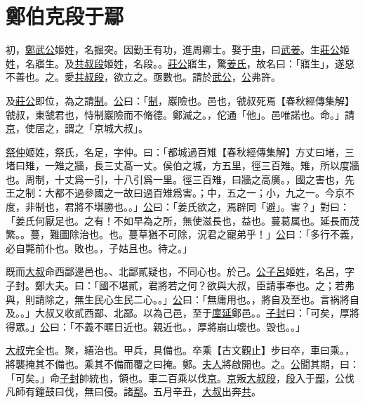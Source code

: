 \documentclass{article}
\date{}
\newcommand{\tsu}{\small\kaishu\color{brown}}
\newcommand{\ta}{\small\kaishu\color{applegreen}}
\begin{document}
\makecover
\tableofcontents

\section{鄭伯克段于鄢}

\noindent{\tsu 隱公元年}

初，\uline{鄭武公}{\tsu 姬姓，名掘突。因勤王有功，進周卿士。}娶于\uline{申}，曰\uline{武姜}。生\uline{莊公}{\tsu 姬姓，名寤生。}及\uline{共叔段}{\tsu 姬姓，名段。}。\uline{莊公}寤生，驚\uline{姜氏}，故名曰：「寤生」，遂惡{\tsu 不善也。}之。愛\uline{共叔段}，欲立之。亟{\tsu 數也。}請於\uline{武公}，\uline{公}弗許。

及\uline{莊公}即位，為之請\uline{制}。\uline{公}曰：「\uline{制}，巖{\tsu 險也。}邑也，虢叔死焉{\ta 【春秋經傳集解】虢叔，東虢君也，恃制巖險而不脩德。鄭滅之。}，佗{\tsu 通「他」。}邑唯{\tsu 諾也。}命。」請\uline{京}，使居之，謂之「京城大叔」。

\uline{祭仲}{\tsu 姬姓，祭氏，名足，字仲。}曰：「都城過百雉{\ta【春秋經傳集解】方丈曰堵，三堵曰雉，一雉之牆，長三丈髙一丈。侯伯之城，方五里，徑三百雉。}{\tsu 雉，所以度牆也。周制，十丈爲一引，十八引爲一里。徑三百雉，曰牆之高廣。}，國之害也，先王之制：大都不過參國之一{\tsu 故曰過百雉爲害。}；中，五之一；小，九之一。今京不度，非制也，君將不堪{\tsu 勝也。}。」\uline{公}曰：「姜氏欲之，焉辟{\tsu 同「避」。}害？」對曰：「姜氏何厭{\tsu 足也。}之有！不如早為之所，無使滋{\tsu 長也，益也。}蔓{\tsu 葛属也。延長而茂繁。}。蔓，難圖{\tsu 除治也。}也。蔓草猶不可除，況君之寵弟乎！」\uline{公}曰：「多行不義，必自斃{\tsu 前仆也。敗也。}，子姑{\tsu 且也。}待之。」

既而\uline{大叔}命西鄙{\tsu 邊邑也。}、北鄙貳{\tsu 疑也，不同心也。}於己。\uline{公子呂}{\tsu 姬姓，名呂，字子封。鄭大夫。}曰：「國不堪貳，君將若之何？欲與大叔，臣請事{\tsu 奉也。}之；若弗與，則請除之，無生民心{\tsu 生民二心。}。」\uline{公}曰：「無庸{\tsu 用也。}，將自及{\tsu 至也。言祸將自及。}。」大叔又收貳{\tsu 西鄙、北鄙。}以為己邑，至于\uline{廩延}{\tsu 鄭邑。}。\uline{子封}曰：「可矣，厚將得眾。」\uline{公}曰：「不義不暱{\tsu 日近也。親近也。}，厚將崩{\tsu 山壞也。毁也。}。」

\uline{大叔}完{\tsu 全也。}聚，繕{\tsu 治也。}甲兵，具{\tsu 備也。}卒乘{\ta 【古文觀止】步曰卒，車曰乘。}，將襲{\tsu 掩其不備也。乘其不備而覆之曰掩。}鄭。\uline{夫人}將啟{\tsu 開也。}之。\uline{公}聞其期，曰：「可矣。」命\uline{子封}帥{\tsu 統也，領也。}車二百乘以伐\uline{京}。\uline{京}叛\uline{大叔段}，\uline{段}入于\uline{鄢}，公伐{\tsu 凡師有鐘鼓曰伐，無曰侵。}諸\uline{鄢}。五月辛丑，\uline{大叔}出奔\uline{共}。
\end{document}
